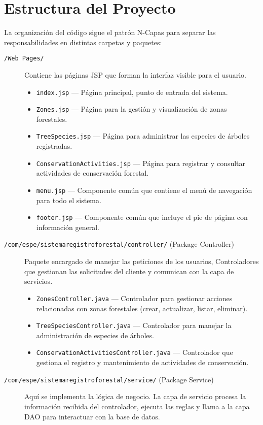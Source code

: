 \section{Estructura del Proyecto}
La organización del código sigue el patrón N-Capas para separar las responsabilidades en distintas carpetas y paquetes:
\begin{description}
    \item[\texttt{/Web Pages/}] Contiene las páginas JSP que forman la interfaz visible para el usuario.
    \begin{itemize}
        \item \texttt{index.jsp} — Página principal, punto de entrada del sistema.
        \item \texttt{Zones.jsp} — Página para la gestión y visualización de zonas forestales.
        \item \texttt{TreeSpecies.jsp} — Página para administrar las especies de árboles registradas.
        \item \texttt{ConservationActivities.jsp} — Página para registrar y consultar actividades de conservación forestal.
        \item \texttt{menu.jsp} — Componente común que contiene el menú de navegación para todo el sistema.
        \item \texttt{footer.jsp} — Componente común que incluye el pie de página con información general.
    \end{itemize}
    \item[\texttt{/com/espe/sistemaregistroforestal/controller/} (Package Controller)] Paquete encargado de manejar las peticiones de los usuarios, Controladores que gestionan las solicitudes del cliente y comunican con la capa de servicios.
    \begin{itemize}
        \item \texttt{ZonesController.java} — Controlador para gestionar acciones relacionadas con zonas forestales (crear, actualizar, listar, eliminar).
        \item \texttt{TreeSpeciesController.java} — Controlador para manejar la administración de especies de árboles.
        \item \texttt{ConservationActivitiesController.java} — Controlador que gestiona el registro y mantenimiento de actividades de conservación.
    \end{itemize}
    \item[\texttt{/com/espe/sistemaregistroforestal/service/} (Package Service)] Aquí se implementa la lógica de negocio. La capa de servicio procesa la información recibida del controlador, ejecuta las reglas y llama a la capa DAO para interactuar con la base de datos.

\end{description}
